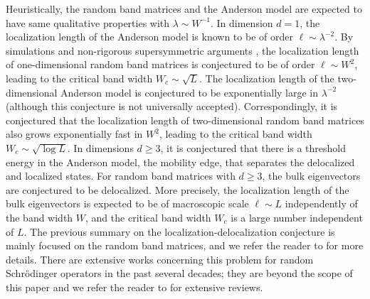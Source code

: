 \documentclass{article}
\newcommand{\1}{\mathds{1}}
\numberwithin{equation}{section}
\renewcommand{\geq}{\geqslant}
\renewcommand{\ge}{\geq}
\DeclareMathOperator{\OO}{O}
\theoremstyle{plain} %
\theoremstyle{remark}
\newcommand{\cor}{\color{red}}
\newcommand{\hty}[1]{{\cor (ht: #1) }}
\begin{document}
Heuristically, the random band matrices and the Anderson model are expected to have  same qualitative properties with $\lambda \sim W^{-1}$. 
In dimension $d=1$, the localization length of the Anderson model %
is known to be of order $\ell\sim \lambda^{-2}$. %
By simulations \cite{ConJ-Ref1, ConJ-Ref2, ConJ-Ref4, ConJ-Ref6} and non-rigorous supersymmetric arguments \cite{fy}, the localization length of one-dimensional random band matrices is conjectured to be of order $\ell \sim W^2$,  leading  to the critical band width $W_c\sim \sqrt L$. The localization length of the two-dimensional Anderson model is conjectured to be exponentially large in $\lambda^{-2}$ \cite{PRL_Anderson} (although this conjecture is not universally accepted). Correspondingly, it is conjectured that the localization length of %
two-dimensional random band matrices also grows exponentially fast in $W^{2}$, leading to the critical band width $W_c\sim \sqrt{\log L}$. In dimensions $d\ge 3$, it is conjectured that there is a threshold energy in the Anderson model,  the mobility edge, that separates the delocalized and localized states. For random band matrices with $d\ge 3$, 
the bulk eigenvectors are conjectured to be delocalized. %
More precisely, the localization length of the bulk eigenvectors is expected to be of macroscopic scale $\ell\sim L$ independently of the band width $W$, and the critical band width $W_c$ is a large number independent of $L$. 
The previous summary on the localization-delocalization conjecture is mainly focused on the random band matrices, and we refer the reader to \cite{Spencer1,Spencer2,Spencer3, PB_review} for more details. There are extensive works concerning this problem for random Schr\"odinger operators in the past several  decades;  %
they are beyond the scope of this paper and we refer the reader to \cite{Kirsch2007,CarLa1990,Spencer_Anderson} for extensive reviews. %
\end{document}
